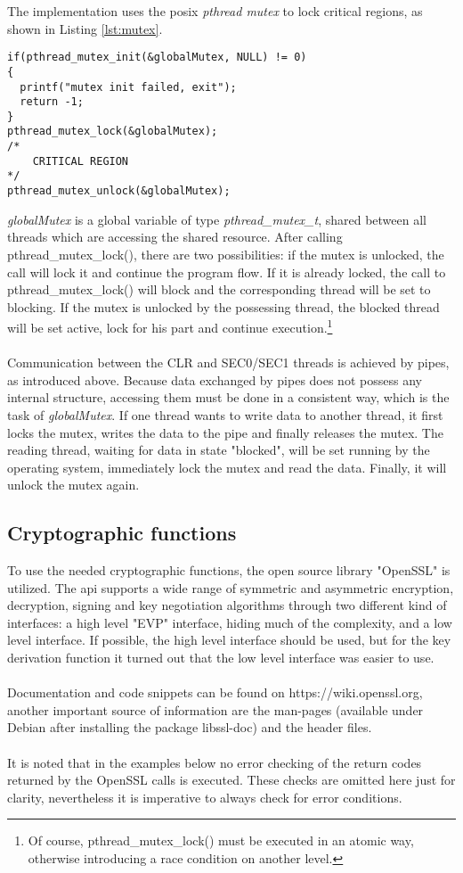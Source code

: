 The implementation uses the \gls{posix} \textit{pthread mutex} to lock critical regions, as shown in Listing \ref{lst:mutex}.  
\begin{lstlisting}[style=cStyle,caption={Locking a critical region},label=lst:mutex]
if(pthread_mutex_init(&globalMutex, NULL) != 0)
{
  printf("mutex init failed, exit");
  return -1;
}
pthread_mutex_lock(&globalMutex);
/*
    CRITICAL REGION
*/
pthread_mutex_unlock(&globalMutex);
\end{lstlisting}
\textit{globalMutex} is a global variable of type \textit{pthread\_mutex\_t}, shared between all threads which are accessing the shared resource. After calling pthread\_mutex\_lock(),
there are two possibilities: if the mutex is unlocked, the call will lock it and continue the program flow. If it is already locked, the call to pthread\_mutex\_lock() will block and
the corresponding thread will be set to blocking.
If the mutex is unlocked by the possessing thread, the blocked thread will be set active, lock for his part and continue execution.\footnote{Of course, pthread\_mutex\_lock() must
be executed in an atomic way, otherwise introducing a race condition on another level.}
\\
\\
Communication between the CLR and SEC0/SEC1 threads is achieved by pipes, as introduced above. Because data exchanged by pipes does not possess any internal structure, accessing
them must be done in a consistent way, which is the task of \textit{globalMutex}. If one thread wants to write data to another thread, it first locks the mutex, writes the
data to the pipe and finally releases the mutex. The reading thread, waiting for data in state "blocked", will be set running by the operating system, immediately lock the mutex
and read the data. Finally, it will unlock the mutex again.

\subsection{Cryptographic functions}
To use the needed cryptographic functions, the open source library "OpenSSL" is utilized. The \gls{api} supports a wide range of symmetric and asymmetric encryption, 
decryption, signing and key negotiation algorithms through two different kind of interfaces: a high level "EVP" interface, hiding much of the complexity, and 
a low level interface. If possible, the high level interface should be used, but for the key derivation function it turned out that the low level interface was easier to use.
\\
\\
Documentation and code snippets can be found on https://wiki.openssl.org, another important source of information are the man-pages (available under Debian after installing the
package libssl-doc) and the header files.
\\
\\
It is noted that in the examples below no error checking of the return codes returned by the OpenSSL calls is executed. These checks are omitted here just for clarity, nevertheless it is
imperative to always check for error conditions.

